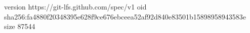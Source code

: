 version https://git-lfs.github.com/spec/v1
oid sha256:fa4880f20348395e628f9ce676ebceea52af92d840e83501b15898958943583e
size 87544
